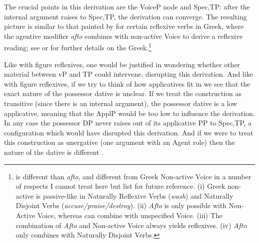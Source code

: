 
\vspace{2em}

The crucial points in this derivation are the VoiceP node and Spec,TP: after the internal argument raises to Spec,TP, the derivation can converge. The resulting picture is similar to that painted by \cite{spathasetal15} for certain reflexive verbs in Greek, where the agentive modifier \emph{afto} combines with non-active Voice to derive a reflexive reading; see \cite{spathasetal15} or \cite{kastner17gjgl} for further details on the Greek.\footnote{{\va} is different than \emph{afto}, and {\vz} different from Greek Non-active Voice in a number of respects I cannot treat here but list for future reference. (i) Greek non-active is passive-like in Naturally Reflexive Verbs (\emph{wash}) and Naturally Disjoint Verbs (\emph{accuse/praise/destroy}). (ii) \emph{Afto} is only possible with Non-Active Voice, whereas {\va} can combine with unspecified Voice. (iii) The combination of \emph{Afto} and Non-active Voice always yields reflexives. (iv) \emph{Afto} only combines with Naturally Disjoint Verbs.}

Like with figure reflexives, one would be justified in wondering whether other material between vP and TP could intervene, disrupting this derivation. And like with figure reflexives, if we try to think of how applicatives fit in we see that the exact nature of the possessor dative is unclear. If we treat the construction as transitive (since there is an internal argument), the possessor dative is a low applicative, meaning that the ApplP would be too low to influence the derivation. In any case the possessor DP never raises out of its applicative PP to Spec,TP, a configuration which would have disrupted this derivation. And if we were to treat this construction as unergative (one argument with an Agent role) then the nature of the dative is different \citep{barashersiegalboneh15,barashersiegalboneh16}.

